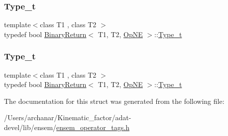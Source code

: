 \mbox{\label{structBinaryReturn_3_01T1_00_01T2_00_01OpNE_01_4_af07b822218544651a5f4470391645f55}} 
\subsubsection{\texorpdfstring{Type\_t}{Type\_t}\hspace{0.1cm}{\footnotesize\ttfamily [2/3]}}
{\footnotesize\ttfamily template$<$class T1 , class T2 $>$ \\
typedef bool \mbox{\hyperlink{structBinaryReturn}{Binary\+Return}}$<$ T1, T2, \mbox{\hyperlink{structOpNE}{Op\+NE}} $>$\+::\mbox{\hyperlink{structBinaryReturn_3_01T1_00_01T2_00_01OpNE_01_4_af07b822218544651a5f4470391645f55}{Type\+\_\+t}}}

\mbox{\label{structBinaryReturn_3_01T1_00_01T2_00_01OpNE_01_4_af07b822218544651a5f4470391645f55}} 
\subsubsection{\texorpdfstring{Type\_t}{Type\_t}\hspace{0.1cm}{\footnotesize\ttfamily [3/3]}}
{\footnotesize\ttfamily template$<$class T1 , class T2 $>$ \\
typedef bool \mbox{\hyperlink{structBinaryReturn}{Binary\+Return}}$<$ T1, T2, \mbox{\hyperlink{structOpNE}{Op\+NE}} $>$\+::\mbox{\hyperlink{structBinaryReturn_3_01T1_00_01T2_00_01OpNE_01_4_af07b822218544651a5f4470391645f55}{Type\+\_\+t}}}



The documentation for this struct was generated from the following file\+:\begin{DoxyCompactItemize}
\item 
/\+Users/archanar/\+Kinematic\+\_\+factor/adat-\/devel/lib/ensem/\mbox{\hyperlink{adat-devel_2lib_2ensem_2ensem__operator__tags_8h}{ensem\+\_\+operator\+\_\+tags.\+h}}\end{DoxyCompactItemize}
